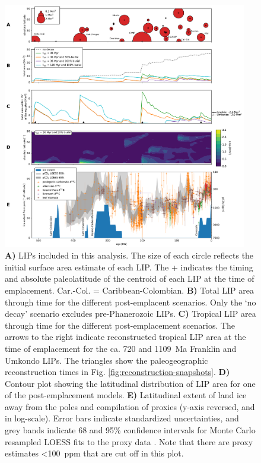 \begin{figure}[!htbp]
\begin{center}
	\includegraphics[width=0.95\textwidth]{figures/LIPs/LIP-areas.pdf}
	\caption[Reconstructed large igneous province areas, ice extent, and \pCOtwo proxies.]{\textbf{A)} LIPs included in this analysis. The size of each circle reflects the initial surface area estimate of each LIP. The + indicates the timing and absolute paleolatitude of the centroid of each LIP at the time of emplacement. Car.-Col. = Caribbean-Colombian. \textbf{B)} Total LIP area through time for the different post-emplacent scenarios. Only the `no decay' scenario excludes pre-Phanerozoic LIPs. \textbf{C)} Tropical LIP area through time for the different post-emplacement scenarios. The arrows to the right indicate reconstructed tropical LIP area at the time of emplacement for the ca. 720 and 1109~Ma Franklin and Umkondo LIPs. The triangles show the paleogeographic reconstruction times in Fig. \ref{fig:reconstruction-snapshots}. \textbf{D)} Contour plot showing the latitudinal distribution of LIP area for one of the post-emplacement models. \textbf{E)} Latitudinal extent of land ice away from the poles \citep{Macdonald2019a} and compilation of \pCOtwo proxies \citep{Foster2017a} (\pCOtwo y-axis reversed, and in log-scale). Error bars indicate standardized uncertainties, and grey bands indicate 68 and 95\% confidence intervals for Monte Carlo resampled LOESS fits to the \pCOtwo proxy data \citep{Foster2017a}. Note that there are \pCOtwo proxy estimates \textless100~ppm that are cut off in this plot.}
	\label{fig:LIP-areas}
\end{center}
\end{figure}

